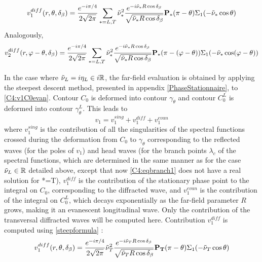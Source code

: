 \begin{equation}
v_1^{diff}(r,\theta,\delta_{\beta})=\frac{e^{-i\pi/4}}{2\sqrt{2\pi}}\sum_{*=L,T}\tilde{\nu}_*^2\frac{e^{-i\tilde{\nu}_*R\cos\delta_{\beta}}}{\sqrt{\tilde{\nu}_*R\cos\delta_{\beta}}}\mathbf{P_*}(\pi-\theta)\Sigma_1(-\tilde{\nu}_*\cos\theta)
\end{equation}
Analogously,
\begin{equation}
v_2^{diff}(r,\varphi-\theta,\delta_{\beta})=\frac{e^{-i\pi/4}}{2\sqrt{2\pi}}\sum_{*=L,T}\tilde{\nu}_*^2\frac{e^{-i\tilde{\nu}_*R\cos\delta_{\beta}}}{\sqrt{\tilde{\nu}_*R\cos\delta_{\beta}}}\mathbf{P_*}(\pi-(\varphi-\theta))\Sigma_1(-\tilde{\nu}_*\cos(\varphi-\theta))
\end{equation}

In the case where $\tilde{\nu}_L=i\eta_L \in i\mathbb{R}$, the far-field evaluation is obtained by applying the steepest descent method, presented in appendix \ref{PhaseStationnaire}, to \eqref{C4:v1C0evan}. Contour $C_0$ is deformed into contour $\gamma_{\theta}$ and contour $C_0^L$ is deformed into contour $\gamma_{\theta}^L$. This leads to
\begin{equation}
v_1=v_1^{sing}+v_1^{diff}+v_1^{evan}
\end{equation}
where $v_1^{sing}$ is the contribution of all the singularities of the spectral functions crossed during the deformation from $C_0$ to $\gamma_{\theta}$ corresponding to the reflected waves (for the poles of $v_1$) and head waves (for the branch points $\lambda_c$ of the spectral functions, which are determined in the same manner as for the case $\tilde{\nu}_L \in \mathbb{R}$ detailed above, except that now  \eqref{C4:eqbranch1} does not have a real solution for *=T), $v_1^{diff}$ is the contribution of the stationary phase point to the integral on $C_0$, corresponding to the diffracted wave, and $v_1^{evan}$ is the contribution of the integral on $C_0^L$, which decays exponentially as the far-field parameter $R$ grows, making it an evanescent longitudinal wave. Only the contribution of the transversal diffracted waves will be computed here. Contribution $v_1^{diff}$ is computed using \eqref{steepformula} :
\begin{equation}
v_1^{diff}(r,\theta,\delta_{\beta})=\frac{e^{-i\pi/4}}{2\sqrt{2\pi}}\tilde{\nu}_T^2\frac{e^{-i\tilde{\nu}_TR\cos\delta_{\beta}}}{\sqrt{\tilde{\nu}_TR\cos\delta_{\beta}}}\mathbf{P_T}(\pi-\theta)\Sigma_1(-\tilde{\nu}_T\cos\theta)
\end{equation}
